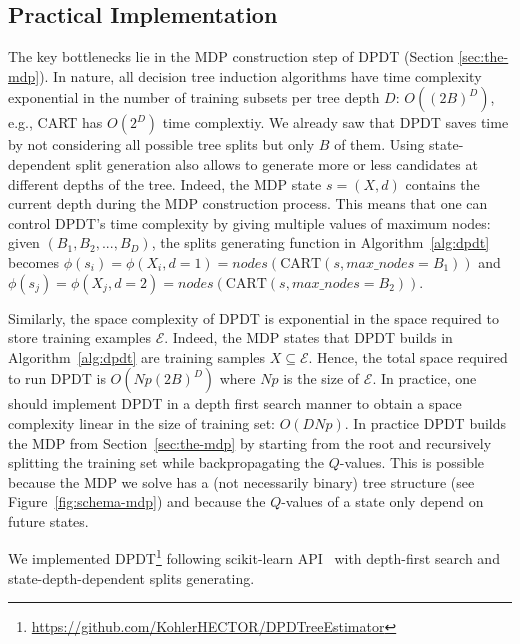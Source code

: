 \subsection{Practical Implementation}

The key bottlenecks lie in the MDP construction step of DPDT (Section \ref{sec:the-mdp}). In nature, all decision tree induction algorithms have time complexity exponential in the number of training subsets per tree depth $D$: $O((2B)^D)$, e.g., CART has $O(2^D)$ time complextiy. We already saw that DPDT saves time by not considering all possible tree splits but only $B$ of them. Using state-dependent split generation also allows to generate more or less candidates at different depths of the tree. Indeed, the MDP state $s = (X,d)$ contains the current depth during the MDP construction process. This means that one can control DPDT's time complexity by giving multiple values of maximum nodes: given $(B_1, B_2, ..., B_D)$, the splits generating function in Algorithm~\ref{alg:dpdt} becomes $\phi(s_i) = \phi(X_i, d=1) = nodes(\text{CART}(s, max\_nodes=B_1))$ and  $\phi(s_j) = \phi(X_j, d=2) = nodes(\text{CART}(s, max\_nodes=B_2))$.

Similarly, the space complexity of DPDT is exponential in the space required to store training examples $\mathcal E$. Indeed, the MDP states that DPDT builds in Algorithm~\ref{alg:dpdt} are training samples $X\subseteq \mathcal E$. Hence, the total space required to run DPDT is $O({Np}(2B)^{D})$ where $Np$ is the size of $\mathcal{E}$. In practice, one should implement DPDT in a depth first search manner to obtain a space complexity linear in the size of training set: $O(DNp)$. In practice DPDT builds the MDP from Section~\ref{sec:the-mdp} by starting from the root and recursively splitting the training set while backpropagating the $Q$-values. This is possible because the MDP we solve has a (not necessarily binary) tree structure (see Figure~\ref{fig:schema-mdp}) and because the $Q$-values of a state only depend on future states. 

We implemented DPDT\footnote{\url{https://github.com/KohlerHECTOR/DPDTreeEstimator}} following scikit-learn API~\cite{sklearn_api} with depth-first search and state-depth-dependent splits generating. 